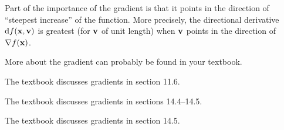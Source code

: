 Part of the importance of the gradient is that it points in the direction of ``steepest increase'' of the function.
More precisely, the directional derivative ${\mathrm{d} f}(\mathbf{x},\mathbf{v})$ is greatest (for $\mathbf{v}$ of unit length) when $\mathbf{v}$ points in the direction of $\nabla f(\mathbf{x})$.
\begin{notextbook}More about the gradient can probably be found in your textbook.\end{notextbook}%
\begin{stewart}The textbook discusses gradients in section 11.6.\end{stewart}%
\begin{hugheshallett}The textbook discusses gradients in sections 14.4--14.5.\end{hugheshallett}%
\begin{rogawski}The textbook discusses gradients in section 14.5.\end{rogawski}%
